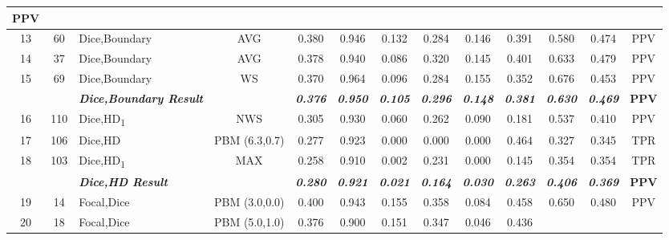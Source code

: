 \begin{table}[H]
{\begin{tabular}{cc|l|c|c|c|c|c|c|c|c|c|c|}
    \textbf{PPV} \\ \hline
  \multicolumn{1}{|c|}{13} &
    60 &
    Dice,Boundary &
    AVG &
    0.380 &
    0.946 &
    0.132 &
    0.284 &
    0.146 &
    0.391 &
    0.580 &
    0.474 &
    PPV \\ \hline
  \multicolumn{1}{|c|}{14} &
    37 &
    Dice,Boundary &
    AVG &
    0.378 &
    0.940 &
    0.086 &
    0.320 &
    0.145 &
    0.401 &
    0.633 &
    0.479 &
    PPV \\ \hline
  \multicolumn{1}{|c|}{15} &
    69 &
    Dice,Boundary &
    WS &
    0.370 &
    0.964 &
    0.096 &
    0.284 &
    0.155 &
    0.352 &
    0.676 &
    0.453 &
    PPV \\ \hline
  \textbf{} &
    \textit{\textbf{}} &
    \textit{\textbf{Dice,Boundary Result}} &
    \textbf{} &
    \textit{\textbf{0.376}} &
    \textit{\textbf{0.950}} &
    \textit{\textbf{0.105}} &
    \textit{\textbf{0.296}} &
    \textit{\textbf{0.148}} &
    \textit{\textbf{0.381}} &
    \textit{\textbf{0.630}} &
    \textit{\textbf{0.469}} &
    \textbf{PPV} \\ \hline
  \multicolumn{1}{|c|}{16} &
    110 &
    Dice,HD\textsubscript{1} &
    NWS &
    0.305 &
    0.930 &
    0.060 &
    0.262 &
    0.090 &
    0.181 &
    0.537 &
    0.410 &
    PPV \\ \hline
  \multicolumn{1}{|c|}{17} &
    106 &
    Dice,HD &
    PBM (6.3,0.7) &
    0.277 &
    0.923 &
    0.000 &
    0.000 &
    0.000 &
    0.464 &
    0.327 &
    0.345 &
    TPR \\ \hline
  \multicolumn{1}{|c|}{18} &
    103 &
    Dice,HD\textsubscript{1} &
    MAX &
    0.258 &
    0.910 &
    0.002 &
    0.231 &
    0.000 &
    0.145 &
    0.354 &
    0.354 &
    TPR \\ \hline
  \textbf{} &
    \textit{\textbf{}} &
    \textit{\textbf{Dice,HD Result}} &
    \textbf{} &
    \textit{\textbf{0.280}} &
    \textit{\textbf{0.921}} &
    \textit{\textbf{0.021}} &
    \textit{\textbf{0.164}} &
    \textit{\textbf{0.030}} &
    \textit{\textbf{0.263}} &
    \textit{\textbf{0.406}} &
    \textit{\textbf{0.369}} &
    \textbf{PPV} \\ \hline
  \multicolumn{1}{|c|}{19} &
    14 &
    Focal,Dice &
    PBM (3.0,0.0) &
    0.400 &
    0.943 &
    0.155 &
    0.358 &
    0.084 &
    0.458 &
    0.650 &
    0.480 &
    PPV \\ \hline
  \multicolumn{1}{|c|}{20} &
    18 &
    Focal,Dice &
    PBM (5.0,1.0) &
    0.376 &
    0.900 &
    0.151 &
    0.347 &
    0.046 &
    0.436 &

\end{tabular}}
\end{table}
